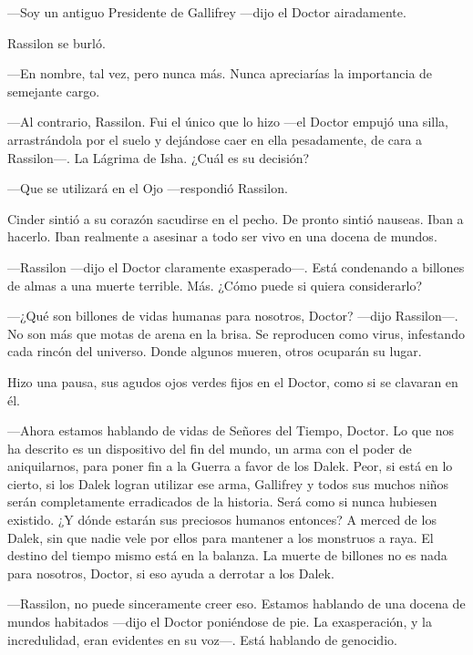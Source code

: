 —Soy un antiguo Presidente de Gallifrey —dijo el Doctor airadamente. 



Rassilon se burló. 

—En nombre, tal vez, pero nunca más. Nunca apreciarías la importancia de semejante cargo. 



—Al contrario, Rassilon. Fui el único que lo hizo —el Doctor empujó una silla, arrastrándola por el suelo y dejándose caer en ella pesadamente, de cara a Rassilon—. La Lágrima de Isha. ¿Cuál es su decisión? 



—Que se utilizará en el Ojo —respondió Rassilon. 



Cinder sintió a su corazón sacudirse en el pecho. De pronto sintió nauseas. Iban a hacerlo. Iban realmente a asesinar a todo ser vivo en una docena de mundos. 



—Rassilon —dijo el Doctor claramente exasperado—. Está condenando a billones de almas a una muerte terrible. Más. ¿Cómo puede si quiera considerarlo? 



—¿Qué son billones de vidas humanas para nosotros, Doctor? —dijo Rassilon—. No son más que motas de arena en la brisa. Se reproducen como virus, infestando cada rincón del universo. Donde algunos mueren, otros ocuparán su lugar. 

Hizo una pausa, sus agudos ojos verdes fijos en el Doctor, como si se clavaran en él. 



—Ahora estamos hablando de vidas de Señores del Tiempo, Doctor. Lo que nos ha descrito es un dispositivo del fin del mundo, un arma con el poder de aniquilarnos, para poner fin a la Guerra a favor de los Dalek. Peor, si está en lo cierto, si los Dalek logran utilizar ese arma, Gallifrey y todos sus muchos niños serán completamente erradicados de la historia. Será como si nunca hubiesen existido. ¿Y dónde estarán sus preciosos humanos entonces? A merced de los Dalek, sin que nadie vele por ellos para mantener a los monstruos a raya. El destino del tiempo mismo está en la balanza. La muerte de billones no es nada para nosotros, Doctor, si eso ayuda a derrotar a los Dalek. 



—Rassilon, no puede sinceramente creer eso. Estamos hablando de una docena de mundos habitados —dijo el Doctor poniéndose de pie. La exasperación, y la incredulidad, eran evidentes en su voz—. Está hablando de genocidio. 



